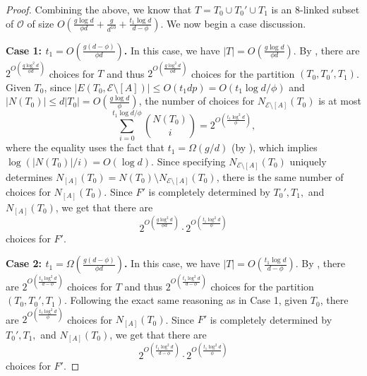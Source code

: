 \documentclass{amsart}
\theoremstyle{definition}
\newcommand{\cO}{\mathcal{O} }
\newcommand{\cE}{\mathcal{E} }
\newcommand{\0}[0]{\emptyset}
\begin{document}
\begin{proof}
Combining the above, we know that $T=T_0\cup T_0'\cup T_1$ is an 8-linked subset of $\cO$ of size $O(\frac{g\log d}{\phi d}+\frac{g}{d^{10}}+\frac{t_1\log d}{d-\phi})$. We now begin a case discussion.

\noindent \textbf{Case 1: $t_1=O(\frac{g(d-\phi)}{\phi d})$.} In this case, we have $|T|=O(\frac{g\log d}{\phi d})$. By , there are $2^{O(\frac{g\log^2 d}{\phi d})}$ choices for $T$ and thus $2^{O(\frac{g\log^2 d}{\phi d})}$ choices for the partition $(T_0,T_0',T_1)$. 
Given $T_0$, since $|E(T_0,\cE\setminus[A])|\leq O(t_1dp)=O(t_1\log d/\phi)$ and $|N(T_0)| \le d|T_0| = O(\frac{g\log d}{\phi})$, the number of choices for $N_{\cE\setminus[A]}(T_0)$ is at most
\[
\sum_{i=0}^{t_1\log d/\phi}\binom{N(T_0)}{i}=2^{O\left(\frac{t_1\log^2 d}{\phi}\right)},
\]
where the equality uses the fact that $t_1 = \Omega(g/d)$ (by ), which implies $\log(|N(T_0)|/i) = O(\log d)$. Since specifying $N_{\cE\setminus[A]}(T_0)$ uniquely determines $N_{[A]}(T_0) = N(T_0)\setminus N_{\cE\setminus[A]}(T_0)$, there is the same number of choices for $N_{[A]}(T_0)$. Since $F'$ is completely determined by $T_0',T_1,$ and $N_{[A]}(T_0)$, we get that there are 
\[
2^{O\left(\frac{g\log^2 d}{\phi d}\right)}\cdot 2^{O\left(\frac{t_1\log^2 d}{\phi}\right)}
\]
choices for $F'$.

\noindent \textbf{Case 2: $t_1=\Omega(\frac{g(d-\phi)}{\phi d})$.} In this case, we have $|T|=O(\frac{t_1\log d}{d-\phi})$. By , there are $2^{O(\frac{t_1\log^2 d}{d-\phi})}$ choices for $T$ and thus $2^{O(\frac{t_1\log^2 d}{d-\phi})}$ choices for the partition $(T_0,T_0',T_1)$. 
Following the exact same reasoning as in Case 1, given $T_0$, there are $2^{O(\frac{t_1\log^2 d}{\phi})}$ choices for $N_{[A]}(T_0)$. Since $F'$ is completely determined by $T_0',T_1,$ and $N_{[A]}(T_0)$, we get that there are 
\[
2^{O\left(\frac{t_1\log^2 d}{d-\phi}\right)}\cdot 2^{O\left(\frac{t_1\log^2 d}{\phi}\right)}
\]
choices for $F'$.
\end{proof}
\end{document}

